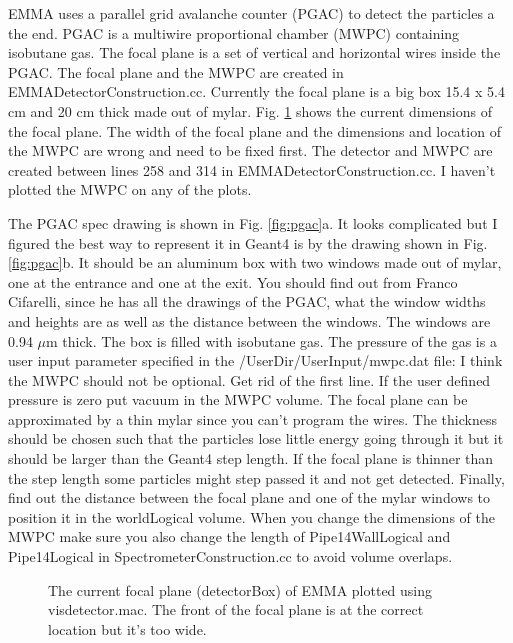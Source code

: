 \documentclass[letter,11pt]{article}
\begin{document}
EMMA uses a parallel grid avalanche counter (PGAC) to detect the particles a the end. PGAC is a multiwire proportional chamber (MWPC) containing isobutane gas. The focal plane is a set of vertical and horizontal wires inside the PGAC. The focal plane and the MWPC are created in EMMADetectorConstruction.cc. Currently the focal plane is a big box 15.4 x 5.4 cm and 20 cm thick made out of mylar. Fig. \ref{fig:detector} shows the current dimensions of the focal plane. The width of the focal plane and the dimensions and location of the MWPC are wrong and need to be fixed first. The detector and MWPC are created between lines 258 and 314 in EMMADetectorConstruction.cc. I haven't plotted the MWPC on any of the plots.

The PGAC spec drawing is shown in Fig. \ref{fig:pgac}a. It looks complicated but I figured the best way to represent it in Geant4 is by the drawing shown in Fig. \ref{fig:pgac}b. It should be an aluminum box with two windows made out of mylar, one at the entrance and one at the exit. You should find out from Franco Cifarelli, since he has all the drawings of the PGAC, what the window widths and heights are as well as the distance between the windows. The windows are 0.94 $\mu$m thick. The box is filled with isobutane gas. The pressure of the gas is a user input parameter specified in the /UserDir/UserInput/mwpc.dat file:
{\footnotesize }
I think the MWPC should not be optional. Get rid of the first line. If the user defined pressure is zero put vacuum in the MWPC volume. The focal plane can be approximated by a thin mylar since you can't program the wires. The thickness should be chosen such that the particles lose little energy going through it but it should be larger than the Geant4 step length. If the focal plane is thinner than the step length some particles might step passed it and not get detected. Finally, find out the distance between the focal plane and one of the mylar windows to position it in the worldLogical volume. When you change the dimensions of the MWPC make sure you also change the length of Pipe14WallLogical and Pipe14Logical in SpectrometerConstruction.cc to avoid volume overlaps.

\begin{figure}
\centering
	\caption{The current focal plane (detectorBox) of EMMA plotted using visdetector.mac. The front of the focal plane is at the correct location but it's too wide.}
	\label{fig:detector}
\end{figure}
\end{document}
